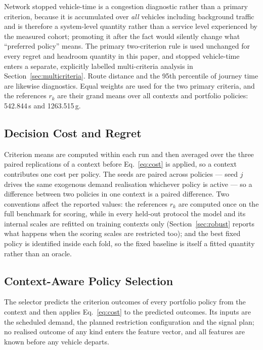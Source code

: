 \documentclass[runningheads]{llncs}
\begin{document}
Network stopped vehicle-time is a congestion diagnostic rather than a primary criterion,
because it is accumulated over \emph{all} vehicles including background traffic and is
therefore a system-level quantity rather than a service level experienced by the measured
cohort; promoting it after the fact would silently change what ``preferred policy'' means.
The primary two-criterion rule is used unchanged for every regret and headroom quantity in
this paper, and stopped vehicle-time enters a separate, explicitly labelled multi-criteria
analysis in Section~\ref{sec:multicriteria}. Route distance and the 95th percentile of
journey time are likewise diagnostics. Equal weights are used for the two primary
criteria, and the references $r_k$ are their grand means over all contexts and portfolio
policies: 542.844\,s and 1263.515\,g.

\subsection{Decision Cost and Regret}

Criterion means are computed within each run and then averaged over the three paired
replications of a context before Eq.~\eqref{eq:cost} is applied, so a context contributes
one cost per policy. The seeds are paired across policies --- seed $j$ drives the same
exogenous demand realisation whichever policy is active --- so a difference between two
policies in one context is a paired difference. Two conventions affect the reported
values: the references $r_k$ are computed once on the full benchmark for scoring, while in
every held-out protocol the model and its internal scales are refitted on training
contexts only (Section~\ref{sec:robust} reports what happens when the scoring scales are
restricted too); and the best fixed policy is identified inside each fold, so the fixed
baseline is itself a fitted quantity rather than an oracle.

\subsection{Context-Aware Policy Selection}

The selector predicts the criterion outcomes of every portfolio policy from the context
and then applies Eq.~\eqref{eq:cost} to the predicted outcomes. Its inputs are the
scheduled demand, the planned restriction configuration and the signal plan; no realised
outcome of any kind enters the feature vector, and all features are known before any
vehicle departs.
\end{document}
